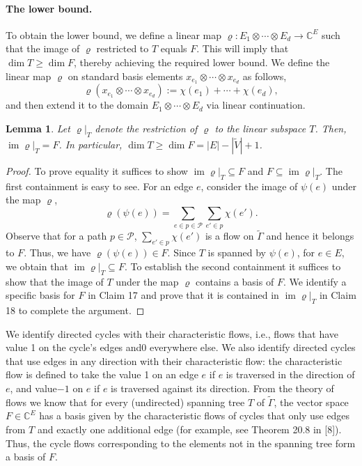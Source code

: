 \documentclass[10pt,a4paper]{article}
\newtheorem{lemma}[theorem]{Lemma}
\newcommand{\C}{\mathbb C}
\DeclareMathOperator{\im}{im}
\begin{document}
\paragraph{The lower bound.}
To obtain the lower bound, we define a linear map $\varrho:E_1\otimes\cdots\otimes E_d\to\C^E$ such that the image of $\varrho$ restricted to $T$ equals $F$. This will imply that $\dim T\ge\dim F$, thereby achieving the required lower bound.
We define the linear map $\varrho$ on standard basis elements $x_{e_1}\otimes\cdots\otimes x_{e_d}$ as follows,
\[\varrho(x_{e_1}\otimes\cdots\otimes x_{e_d}):=\chi(e_1)+\cdots+\chi(e_d),\]
and then extend it to the domain $E_1\otimes\cdots\otimes E_d$ via linear continuation.
\begin{lemma}
Let $\varrho|_T$ denote the restriction of $\varrho$ to the linear subspace $T$. Then, $\im\varrho|_T=F$. In particular, $\dim T\ge\dim F=|E|-|\widetilde V|+1$.
\end{lemma}
\begin{proof}
To prove equality it suffices to show $\im\varrho|_T\subseteq F$ and $F\subseteq\im\varrho|_T$.
The first containment is easy to see. For an edge $e$, consider the image of $\psi(e)$ under the map $\varrho$,
\[\varrho(\psi(e))=\sum_{e\in p\in\mathcal P}\sum_{e'\in p}\chi(e').\]
Observe that for a path $p\in\mathcal P$, $\sum_{e'\in p}\chi(e')$ is a flow on $\widetilde\Gamma$ and hence it belongs to $F$. Thus, we have $\varrho(\psi(e))\in F$. Since $T$ is spanned by $\psi(e)$, for $e\in E$, we obtain that $\im\varrho|_T\subseteq F$.
To establish the second containment it suffices to show that the image of $T$ under the map $\varrho$ contains a basis of $F$. We identify a specific basis for $F$ in Claim 17 and prove that it is contained in $\im\varrho|_T$ in Claim 18 to complete the argument.
\end{proof}
We identify directed cycles with their characteristic flows, i.e., flows that have value 1 on the cycle's edges and0 everywhere else. We also identify directed cycles that use edges in any direction with their characteristic flow: the characteristic flow is defined to take the value 1 on an edge $e$ if $e$ is traversed in the direction of $e$, and value$-1$ on $e$ if $e$ is traversed against its direction.
From the theory of flows we know that for every (undirected) spanning tree $T$ of $\widetilde\Gamma$, the vector space $F\in\C^E$ has a basis given by the characteristic flows of cycles that only use edges from $T$ and exactly one additional edge (for example, see Theorem 20.8 in [8]). Thus, the cycle flows corresponding to the elements not in the spanning tree form a basis of $F$.
\end{document}

